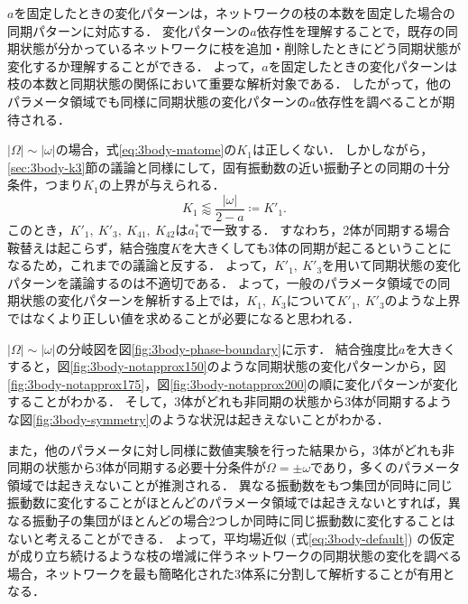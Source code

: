 \documentclass[../main]{subfiles}
\begin{document}
$a$を固定したときの変化パターンは，ネットワークの枝の本数を固定した場合の同期パターンに対応する．
変化パターンの$a$依存性を理解することで，既存の同期状態が分かっているネットワークに枝を追加・削除したときにどう同期状態が変化するか理解することができる．
よって，$a$を固定したときの変化パターンは枝の本数と同期状態の関係において重要な解析対象である．
したがって，他のパラメータ領域でも同様に同期状態の変化パターンの$a$依存性を調べることが期待される．

$|\Omega|\sim|\omega|$の場合，式\eqref{eq:3body-matome}の$K_1$は正しくない．
しかしながら，\ref{sec:3body-k3}節の議論と同様にして，固有振動数の近い振動子との同期の十分条件，つまり$K_1$の上界が与えられる．
\begin{equation}
    \label{K1-approx-dash}
    K_1\lessapprox\frac{|\omega|}{2-a}\coloneqq K'_1.
\end{equation}
このとき，$K'_1,\ K'_3,\ K_{41},\ K_{42}$は$a^\ast_1$で一致する．
すなわち，2体が同期する場合鞍替えは起こらず，結合強度$K$を大きくしても3体の同期が起こるということになるため，これまでの議論と反する．
よって，$K'_1,\ K'_3$を用いて同期状態の変化パターンを議論するのは不適切である．
よって，一般のパラメータ領域での同期状態の変化パターンを解析する上では，$K_1,\ K_3$について$K'_1,\ K'_3$のような上界ではなくより正しい値を求めることが必要になると思われる．

$|\Omega|\sim|\omega|$の分岐図を図\ref{fig:3body-phase-boundary}に示す．
結合強度比$a$を大きくすると，図\ref{fig:3body-notapprox150}のような同期状態の変化パターンから，図\ref{fig:3body-notapprox175}，図\ref{fig:3body-notapprox200}の順に変化パターンが変化することがわかる．
そして，3体がどれも非同期の状態から3体が同期するような図\ref{fig:3body-symmetry}のような状況は起きえないことがわかる．

また，他のパラメータに対し同様に数値実験を行った結果から，3体がどれも非同期の状態から3体が同期する必要十分条件が$\Omega=\pm\omega$であり，多くのパラメータ領域では起きえないことが推測される．
異なる振動数をもつ集団が同時に同じ振動数に変化することがほとんどのパラメータ領域では起きえないとすれば，異なる振動子の集団がほとんどの場合2つしか同時に同じ振動数に変化することはないと考えることができる．
よって，平均場近似 (式\eqref{eq:3body-default}) の仮定が成り立ち続けるような枝の増減に伴うネットワークの同期状態の変化を調べる場合，ネットワークを最も簡略化された3体系に分割して解析することが有用となる．
\end{document}
